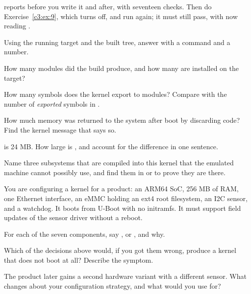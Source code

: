 \checkyourself {} reports  before you write it and 
after, with seventeen checks. Then do Exercise~\ref{c3:ex:9}, which turns 
off, and run  again; it must still pass, with  now reading
.

\label{c3:ex:7}

Using the running target and the built tree, answer with a command and a number.

 How many modules did the build produce, and how many are installed on the target?

 How many symbols does the kernel export to modules? Compare  with the
number of \emph{exported} symbols in .

 How much memory was returned to the system after boot by discarding  code?
Find the kernel message that says so.

  is 24 MB. How large is , and account for the difference in one
sentence.

 Name three subsystems that are compiled into this kernel that the emulated machine cannot
possibly use, and find them in  or  to prove they are
there.

\label{c3:ex:8}

You are configuring a kernel for a product: an ARM64 SoC, 256 MB of RAM, one Ethernet interface, an
eMMC holding an ext4 root filesystem, an I2C sensor, and a watchdog. It boots from U-Boot with no
initramfs. It must support field updates of the sensor driver without a reboot.

 For each of the seven components, say ,  or , and why.

 Which of the decisions above would, if you got them wrong, produce a kernel that does not
boot at all? Describe the symptom.

 The product later gains a second hardware variant with a different sensor. What changes
about your configuration strategy, and what would you use  for?

